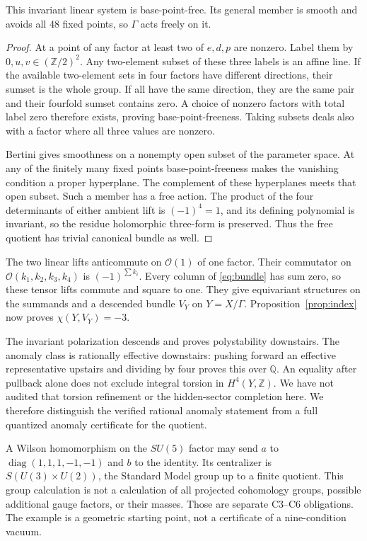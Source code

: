 \begin{lemma}
This invariant linear system is base-point-free. Its general member is
smooth and avoids all 48 fixed points, so $\Gamma$ acts freely on it.
\end{lemma}
\begin{proof}
At a point of any factor at least two of $e,d,p$ are nonzero. Label them
by $0,u,v\in(\mathbb Z/2)^2$. Any two-element subset of these three labels
is an affine line. If the available two-element sets in four factors
have different directions, their sumset is the whole group. If all have
the same direction, they are the same pair and their fourfold sumset
contains zero. A choice of nonzero factors with total label zero therefore
exists, proving base-point-freeness. Taking subsets deals also with a
factor where all three values are nonzero.

Bertini gives smoothness on a nonempty open subset of the parameter
space. At any of the finitely many fixed points base-point-freeness
makes the vanishing condition a proper hyperplane. The complement of
these hyperplanes meets that open subset. Such a member has a free
action. The product of the four determinants of either ambient lift is
$(-1)^4=1$, and its defining polynomial is invariant, so the residue
holomorphic three-form is preserved. Thus the free quotient has trivial
canonical bundle as well.
\end{proof}

The two linear lifts anticommute on $\mathcal O(1)$ of one factor.
Their commutator on $\mathcal O(k_1,k_2,k_3,k_4)$ is
$(-1)^{\sum k_i}$. Every column of \eqref{eq:bundle} has sum zero, so
these tensor lifts commute and square to one. They give equivariant
structures on the summands and a descended bundle $V_Y$ on $Y=X/\Gamma$.
Proposition~\ref{prop:index} now proves $\chi(Y,V_Y)=-3$.

The invariant polarization descends and proves polystability downstairs.
The anomaly class is rationally effective downstairs: pushing forward
an effective representative upstairs and dividing by four proves this
over $\mathbb Q$. An equality after pullback alone does not exclude
integral torsion in $H^4(Y,\mathbb Z)$. We have not audited that torsion
refinement or the hidden-sector completion here. We therefore distinguish
the verified rational anomaly statement from a full quantized anomaly
certificate for the quotient.

A Wilson homomorphism on the $SU(5)$ factor may send $a$ to
$\operatorname{diag}(1,1,1,-1,-1)$ and $b$ to the identity. Its centralizer
is $S(U(3)\times U(2))$, the Standard Model group up to a finite quotient.
This group calculation is not a calculation of all projected cohomology
groups, possible additional gauge factors, or their masses. Those are
separate C3--C6 obligations. The example is a geometric starting point,
not a certificate of a nine-condition vacuum.

